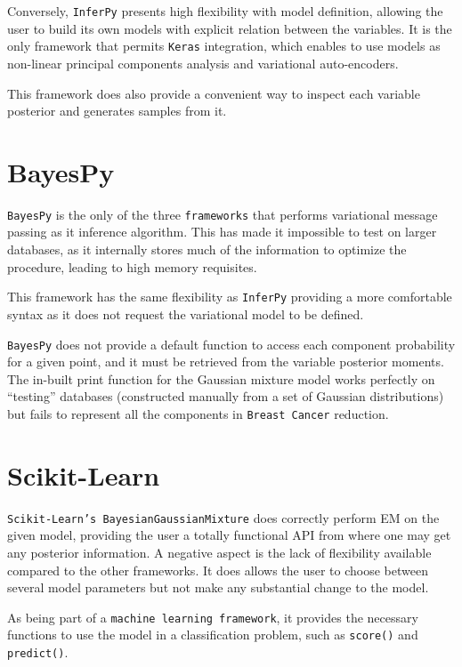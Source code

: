 Conversely, \texttt{InferPy} presents high flexibility with model definition, allowing the user to build its own models with explicit relation between the variables. It is the only framework that permits \texttt{Keras} integration, which enables to use models as non-linear principal components analysis and variational auto-encoders.

This framework does also provide a convenient way to inspect each variable posterior and generates samples from it.


\section*{BayesPy}

\texttt{BayesPy} is the only of the three \texttt{frameworks} that performs variational message passing as it inference algorithm. This has made it impossible to test on larger databases, as it internally stores much of the information to optimize the procedure, leading to high memory requisites.

This framework has the same flexibility as \texttt{InferPy} providing a more comfortable syntax as it does not request the variational model to be defined.

\texttt{BayesPy} does not provide a default function to access each component probability for a given point, and it must be retrieved from the variable posterior moments. The in-built print function for the Gaussian mixture model works perfectly on ``testing'' databases (constructed manually from a set of Gaussian distributions) but fails to represent all the components in \texttt{Breast Cancer} reduction.

\section*{Scikit-Learn}

\texttt{Scikit-Learn's BayesianGaussianMixture} does correctly perform EM on the given model, providing the user a totally functional API from where one may get any posterior information. A negative aspect is the lack of flexibility available compared to the other frameworks. It does allows the user to choose between several model parameters but not make any substantial change to the model.

As being part of a \texttt{machine learning framework}, it provides the necessary functions to use the model in a classification problem, such as \texttt{score()} and \texttt{predict()}.
